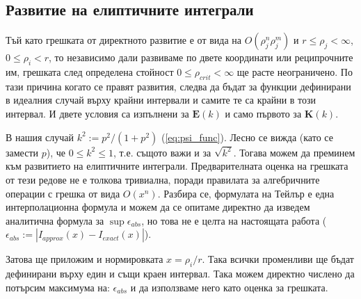 \subsection{Развитие на елиптичните интеграли}
Тъй като грешката от директното развитие е от вида на $O(\rho_j^n \rho_j^m)$ и $r \le \rho_j < \infty$, $0 \le \rho_i < r$, то независимо дали развиваме по двете координати или
реципрочните им, грешката след определена стойност $0 \le \rho_{crit} < \infty$ ще расте неограничено. По тази причина когато се правят развития, следва да бъдат за функции дефинирани
в идеалния случай върху крайни интервали и самите те са крайни в този интервал. И двете условия са изпълнени за $\boldsymbol{E}(k)$ и само първото за $\boldsymbol{K}(k)$. 

В нашия случай $k^2 := p^2/(1+p^2)$ (\autoref{eq:psi_func}). Лесно се вижда (като се замести $p$), че $ 0 \le k^2 \le 1$, т.е. същото важи и за $\sqrt{k^2}$. Тогава можем да преминем към развитието
на елиптичните интеграли. Предварителната оценка на грешката от тези редове не е толкова тривиална, поради правилата за алгебричните операции с грешка от вида $O(x^n)$. Разбира се, формулата на Тейлър е една интерполационна формула и можем да се опитаме директно да изведем 
аналитична формула за $\sup\epsilon_{abs}$, но това не е целта на настоящата работа ($\epsilon_{abs} := |I_{approx}(x) - I_{exact}(x)|$).

Затова ще приложим и нормировката $x = \rho_i/r$. Така всички променливи ще бъдат дефинирани върху един и същи краен интервал. Така можем директно числено да потърсим максимума на: $\epsilon_{abs}$ и да използваме
него като оценка за грешката. 

